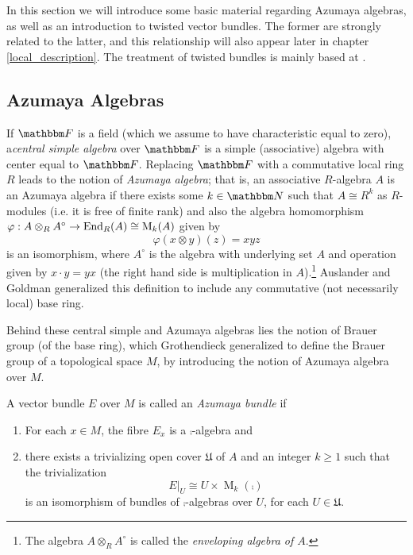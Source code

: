 In this section we will introduce some basic material regarding Azumaya algebras, as well as an introduction to twisted vector bundles. The former are strongly related to the latter, and this relationship will also appear later in chapter \ref{local_description}. The treatment of twisted bundles is mainly based at \cite{karoubi:twisted_vector}.


\subsection{Azumaya Algebras}
\label{subsec_azumaya}

If $\field$ is a field (which we assume to have characteristic equal
to zero), a\emph{central simple algebra} over $\field$ is a simple
(associative) algebra with center equal to $\field$. Replacing
$\field$ with a commutative local ring $R$ leads to the notion of
\emph{Azumaya algebra}; that is, an associative $R$-algebra $A$ is an
Azumaya algebra if there exists some $k\in \natu$ such
that $A\cong R^k$ as $R$-modules (i.e. it is free of finite rank) and
also the algebra homomorphism $\varphi :A\otimes_RA^{\circ }\to
\operatorname{End}_R(A)\cong \operatorname{M}_k(A)$ given by
$$\varphi (x\otimes y)(z)=xyz$$
is an isomorphism, where $A^{\circ}$ is the algebra with underlying set $A$ and operation given by $x\cdot y=yx$ (the right hand side is multiplication in $A$).\footnote{The algebra $A\otimes_R A^{\circ}$ is called the \emph{enveloping algebra of $A$}.} Auslander and Goldman \cite{auslander_goldman} generalized this definition to include any commutative (not necessarily local) base ring.

Behind these central simple and Azumaya algebras lies the notion of Brauer group (of the base ring), which Grothendieck \cite{grothendieck68:_le_group_de_brauer_i} generalized to define the Brauer group of a topological space $M$, by introducing the notion of Azumaya algebra over $M$.


\begin{defi}
A vector bundle $E$ over $M$ is called an \emph{Azumaya bundle} if
\begin{enumerate}
\item For each $x\in M$, the fibre $E_x$ is a $\comp$-algebra and
\item there exists a trivializing open cover $\mathfrak{U}$ of $A$ and an integer $k\geqslant 1$ such that the trivialization
$$E|_U\cong U\times \operatorname{M}_k(\comp )$$
is an isomorphism of bundles of $\comp$-algebras over $U$, for each $U\in \mathfrak{U}$. 
\end{enumerate}
\end{defi}

